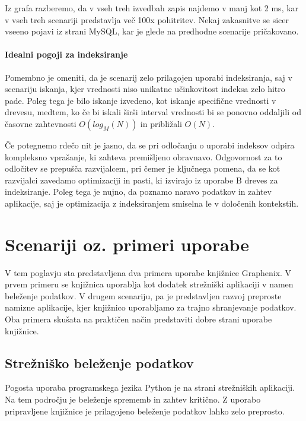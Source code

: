 \documentclass[a4paper,12pt,openright]{book}
\begin{document}
    \noindent
    Iz grafa razberemo, da v vseh treh izvedbah zapis najdemo v manj kot 2 ms, kar v vseh treh scenariji predstavlja več 100x pohitritev. Nekaj zakasnitve se sicer vseeno pojavi iz strani MySQL, kar je glede na predhodne scenarije pričakovano.

    \subsubsection{Idealni pogoji za indeksiranje}
    Pomembno je omeniti, da je scenarij zelo prilagojen uporabi indeksiranja, saj v scenariju iskanja, kjer vrednosti niso unikatne učinkovitost indeksa zelo hitro pade. Poleg tega je bilo iskanje izvedeno, kot iskanje specifične vrednosti v drevesu, medtem, ko če bi iskali širši interval vrednosti bi se ponovno oddaljili od časovne zahtevnosti $O(log_M(N))$ in približali $O(N)$.

    Če potegnemo rdečo nit je jasno, da se pri odločanju o uporabi indeksov odpira kompleksno vprašanje, ki zahteva premišljeno obravnavo. Odgovornost za to odločitev se prepušča razvijalcem, pri čemer je ključnega pomena, da se kot razvijalci zavedamo optimizaciji in pasti, ki izvirajo iz uporabe B dreves za indeksiranje. Poleg tega je nujno, da poznamo naravo podatkov in zahtev aplikacije, saj je optimizacija z indeksiranjem smiselna le v določenih kontekstih.

\chapter{Scenariji oz. primeri uporabe}
\label{ch3}

    V tem poglavju sta predstavljena dva primera uporabe knjižnice Graphenix. V prvem primeru se knjižnica uporablja kot dodatek strežniški aplikaciji v namen beleženje podatkov. V drugem scenariju, pa je predstavljen razvoj preproste namizne aplikacije, kjer knjižnico uporabljamo za trajno shranjevanje podatkov. Oba primera skušata na praktičen način predstaviti dobre strani uporabe knjižnice.

    \section{Strežniško beleženje podatkov}

    Pogosta uporaba programskega jezika Python je na strani strežniških aplikaciji. Na tem področju je beleženje sprememb in zahtev kritično. Z uporabo pripravljene knjižnice je prilagojeno beleženje podatkov lahko zelo preprosto.
\end{document}
